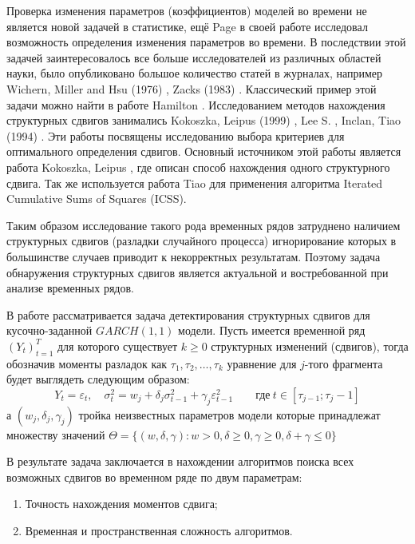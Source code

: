 \documentclass[a4paper,14pt,russian]{extarticle}
\begin{document}
	\par
	Проверка изменения параметров (коэффициентов) моделей во времени не является новой задачей в статистике, ещё Page \cite{Page} в своей работе исследовал возможность определения изменения параметров во времени. В последствии этой задачей заинтересовалось все больше исследователей из различных областей науки, было опубликовано большое количество статей в журналах, например Wichern, Miller and Hsu (1976) \cite{Wichern}, Zacks (1983) \cite{Zacks}. Классический пример этой задачи можно найти в работе Hamilton \cite{Hamilton}. 
	Исследованием методов нахождения структурных сдвигов занимались Kokoszka, Leipus (1999) \cite{Kokoszka}, Lee S. \cite{Lee}, Inclan, Tiao (1994) \cite{Tiao}. Эти работы посвящены исследованию выбора критериев для оптимального определения сдвигов. Основный источником этой работы является работа Kokoszka, Leipus \cite{Kokoszka}, где описан способ нахождения одного структурного сдвига. Так же используется работа Tiao для применения алгоритма Iterated Cumulative Sums of Squares (ICSS).
	\par
	Таким образом исследование такого рода временных рядов затруднено наличием структурных сдвигов (разладки случайного процесса) игнорирование которых в большинстве случаев приводит к некорректных результатам. Поэтому задача обнаружения структурных сдвигов является актуальной и востребованной при анализе временных рядов.
	\par
	В работе рассматривается задача детектирования структурных сдвигов для кусочно-заданной $GARCH(1, 1)$ модели. Пусть имеется временной ряд $(Y_t)_{t=1}^T$ для которого существует $k \geq 0$ структурных изменений (сдвигов), тогда обозначив моменты разладок как $\tau_1, \tau_2, \dots, \tau_k$ уравнение для $j$-того фрагмента будет выглядеть следующим образом:
	\begin{equation}
	\label{eq:1}
		Y_t = \varepsilon_t, \quad \sigma_t^2 = w_j + \delta_j \sigma_{t-1}^2 + \gamma_j \varepsilon_{t-1}^2 \qquad \text{где} \ t \in \left[ \tau_{j - 1}; \tau_j - 1 \right] 
	\end{equation}
	а $(w_j, \delta_j, \gamma_j)$ тройка неизвестных параметров модели которые принадлежат множеству значений $\Theta = \{ (w, \delta, \gamma): w > 0, \delta \geq 0, \gamma \geq 0, \delta + \gamma \le 0 \} $
	\par
	В результате задача заключается в нахождении алгоритмов поиска всех возможных сдвигов во временном ряде по двум параметрам:
	\begin{enumerate}
		\item Точность нахождения моментов сдвига;
		\item Временная и пространственная сложность алгоритмов.
	\end{enumerate}
\end{document}
